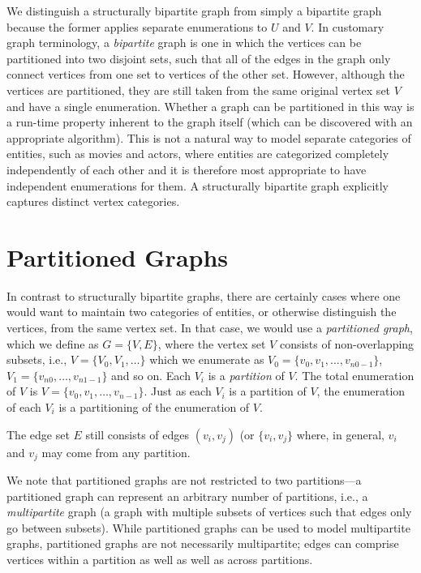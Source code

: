 We distinguish a structurally bipartite graph from simply a bipartite graph because the former applies separate enumerations to $U$ and $V$.  
In customary graph terminology, a \emph{bipartite} graph is one in which the vertices can be partitioned into two disjoint sets, such that all of the edges in the graph only connect vertices from one set to vertices of the other set.  However, although the vertices are partitioned, they are still taken from the same original vertex set $V$ and have a single enumeration.
Whether a graph can be partitioned in this way is a run-time property inherent to the graph itself (which can be discovered with an appropriate algorithm).  
This is not a natural way to model separate categories of entities, such as movies and actors, where entities are categorized completely independently of each other and it is therefore most appropriate to have independent enumerations for them.  
A structurally bipartite graph explicitly captures distinct vertex categories.
%

\section{Partitioned Graphs}

In contrast to structurally bipartite graphs, there are certainly cases
where one would want to maintain two categories of entities, or otherwise distinguish the vertices, from the same vertex set.  In that case, we would use a \emph{partitioned graph}, which we define as
$G = \{ V, E \}$, where the vertex set $V$ consists of non-overlapping subsets, i.e.,
$V = \{ V_0, V_1, \ldots \}$ which we enumerate as $V_0 = \{v_0, v_1, \ldots , v_{n0-1} \}$, 
$V_1 = \{ v_{n0}, \ldots , v_{n1-1} \}$ and so on.  Each $V_i$ is a \emph{partition} of $V$.
The total enumeration of $V$ is $V= \{ v_0, v_1, \ldots , v_{n-1} \}$.  Just as each $V_i$ is a partition of $V$, the enumeration of each $V_i$ is a partitioning of the enumeration of $V$.

The edge set $E$ still consists of edges $(v_i, v_j)$ (or $\{v_i, v_j\}$ where, in general, $v_i$ and $v_j$ may come from any partition.

We note that partitioned graphs are not restricted to two partitions---a partitioned graph can represent an arbitrary number of partitions, i.e., a \emph{multipartite} graph (a graph with multiple subsets of vertices such that edges only go between subsets).
While partitioned graphs can be used to model multipartite graphs, partitioned graphs are not necessarily multipartite; edges can comprise vertices within a partition as well as well as across partitions.

